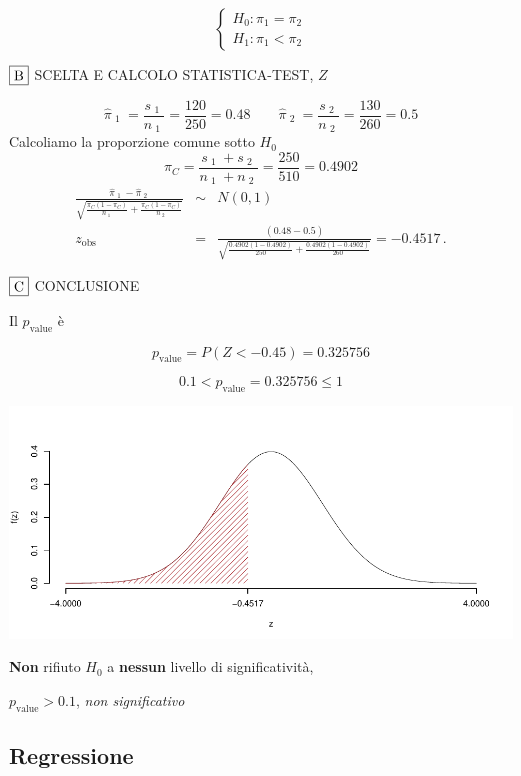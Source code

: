\documentclass[
  11pt,
]{book}
\theoremstyle{mytheoremstyle}
\theoremstyle{mydefstyle}
\begin{document}
\[\begin{cases}
   H_0: \pi_\text{1} = \pi_\text{2} \\
   H_1: \pi_\text{1} < \pi_\text{2} 
   \end{cases}\]

\(\fbox{B}\) SCELTA E CALCOLO STATISTICA-TEST, \(Z\)

\[\hat\pi_\text{ 1 }=\frac{s_\text{ 1 }}{n_\text{ 1 }}=\frac{ 120 }{ 250 }= 0.48 \qquad
   \hat\pi_\text{ 2 }=\frac{s_\text{ 2 }}{n_\text{ 2 }}=\frac{ 130 }{ 260 }= 0.5 \]Calcoliamo la proporzione comune sotto \(H_0\)
\[
     \pi_C=\frac{s_\text{ 1 }+s_\text{ 2 }}{n_\text{ 1 }+n_\text{ 2 }}=
     \frac{ 250 }{ 510 }= 0.4902 
   \]\begin{eqnarray*}
   \frac{\hat\pi_\text{ 1 } - \hat\pi_\text{ 2 }}
   {\sqrt{\frac {\pi_C(1-\pi_C)}{n_\text{ 1 }}+\frac {\pi_C(1-\pi_C)}{n_\text{ 2 }}}}&\sim&N(0,1)\\
   z_{\text{obs}}
   &=& \frac{ ( 0.48 -  0.5 )} {\sqrt{\frac{ 0.4902 (1- 0.4902 )}{ 250 }+\frac{ 0.4902 (1- 0.4902 )}{ 260 }}}
   =   -0.4517 \, .
   \end{eqnarray*}

\(\fbox{C}\) CONCLUSIONE

Il \(p_{\text{value}}\) è

\[ p_{\text{value}} = P(Z<-0.45)=0.325756 \]

\[
 0.1 < p_\text{value}= 0.325756 \leq 1 
\]

\begin{center}\includegraphics{Appunti_di_Statistica_2025_files/figure-latex/25-test-functions-10-13} \end{center}

\textbf{Non} rifiuto \(H_0\) a \textbf{nessun}
livello di significatività,

\(p_\text{value}>0.1\),
\emph{non significativo}

\subsection{Regressione}\label{regressione}
\end{document}
